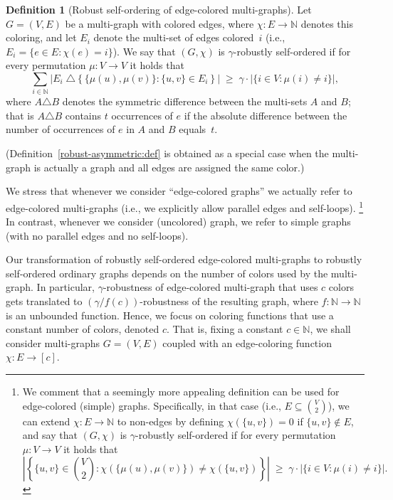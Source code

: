 \documentclass[10pt,a4paper]{article}
\theoremstyle{definition}
\newtheorem{definition}[theorem]{Definition}
\newcommand{\N}{\mathbb N}
\newcommand{\BD}{\begin{definition}}   \newcommand{\ED}{\end{definition}}
\begin{document}
%
\BD[Robust self-ordering of edge-colored multi-graphs]
\label{colored-robust:def}
Let $G=(V,E)$ be a multi-graph with colored edges,
where $\chi\!:\!E\!\to\!\N$ denotes this coloring,
and let $E_i$ denote the multi-set of edges colored~$i$
{\rm(i.e., $E_i=\{e\!\in\!E\!:\!\chi(e)\!=\!i\}$)}.
We say that $(G,\chi)$ is {\sf $\gamma$-robustly self-ordered}
if for every permutation $\mu:V\to{V}$ it holds that
\begin{equation}\label{robust4colored:eqdef}
\sum_{i\in\N}
\Big|E_i\;\triangle
       \left\{\{\mu(u),\mu(v)\}\!:\!\{u,v\}\!\in\!E_i\right\}\Big|
  \;\geq\; \gamma\cdot|\{i\!\in\!V\!:\!\mu(i)\neq i\}|,
\end{equation}
where $A\triangle B$ denotes the symmetric difference
between the multi-sets $A$ and $B$; that is $A\triangle B$
contains $t$ occurrences of $e$ if the absolute difference between
the number of occurrences of $e$ in $A$ and $B$ equals~$t$.
\ED
(Definition~\ref{robust-asymmetric:def} is obtained
as a special case when the multi-graph is actually a graph
and all edges are assigned the same color.)

We stress that whenever we consider ``edge-colored graphs''
we actually refer to edge-colored multi-graphs
(i.e., we explicitly allow parallel edges and self-loops).
\footnote{We comment that a seemingly more appealing definition
can be used for edge-colored (simple) graphs.
Specifically, in that case (i.e., $E\subseteq\binom{V}{2}$),
we can extend $\chi\!:\!E\!\to\!\N$ to non-edges
by defining $\chi(\{u,v\})=0$ if $\{u,v\}\not\in E$,
and say that $(G,\chi)$ is {\sf $\gamma$-robustly self-ordered}
if for every permutation $\mu:V\to{V}$ it holds that\\[-1ex]
$$\left|\left\{\{u,v\}\in \binom{V}{2}:
       \chi(\{\mu(u),\mu(v)\})\!\neq\!\chi(\{u,v\})\right\}\right|
  \;\geq\; \gamma\cdot|\{i\!\in\!V:\mu(i)\neq i\}|.$$}
%
In contrast, whenever we consider (uncolored) graph,
we refer to simple graphs (with no parallel edges and no self-loops).

Our transformation of robustly self-ordered edge-colored multi-graphs
to robustly self-ordered ordinary graphs depends on the number
of colors used by the multi-graph.
In particular, $\gamma$-robustness of edge-colored multi-graph
that uses $c$ colors gets translated to $(\gamma/f(c))$-robustness
of the resulting graph, where $f:\N\to\N$ is an unbounded function.
Hence, we focus on coloring functions that use a constant number of colors,
denoted $c$. That is, fixing a constant $c\in\N$,
we shall consider multi-graphs $G=(V,E)$ coupled with an edge-coloring
function $\chi\!:\!E\!\to\![c]$.
%
%
\end{document}
